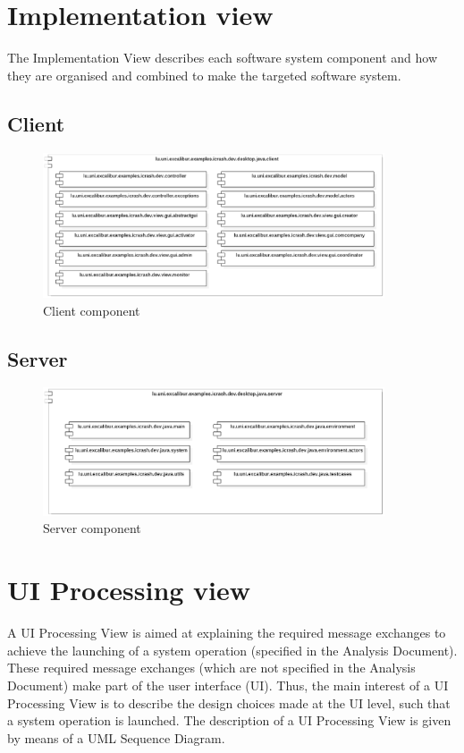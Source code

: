 \section{Implementation view}
The \gls{Implementation View} describes each software system component and how
they are organised and combined to make the targeted software system.


\subsection{Client}

\begin{figure}[h!]
	\centering
	\includegraphics[width=0.9\textwidth]{./images/architecture/impl_view_client.eps}
	\caption{Client component}
\end{figure}

\subsection{Server}

\begin{figure}[h!]
	\centering
	\includegraphics[width=0.9\textwidth]{./images/architecture/impl_view_server.eps}
	\caption{Server component}
\end{figure}





\section{UI Processing view}
A \gls{UI Processing View} is aimed at explaining the required message exchanges
to achieve the launching of a system operation (specified in the \msrmessir
Analysis Document). These required message exchanges (which are not specified in
the \msrmessir Analysis Document) make part of the user interface (UI). Thus, the
main interest of a UI Processing View is to describe the design choices made
at the UI level, such that a system operation is launched. The description
of a UI Processing View is given by means of a UML Sequence Diagram. 


